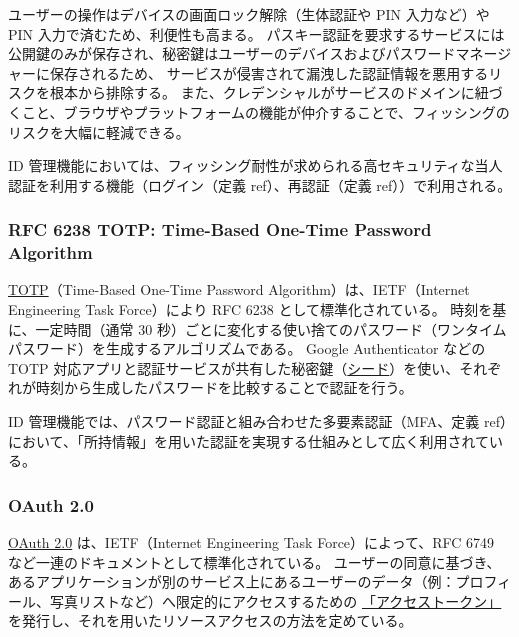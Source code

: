 \documentclass[uplatex]{jsarticle}
\def\ref#1{ref}%
\def\label#1{}%
\newcounter{thm}[section]
\begin{document}
ユーザーの操作はデバイスの画面ロック解除（生体認証や PIN 入力など）や PIN 入力で済むため、利便性も高まる。
パスキー認証を要求するサービスには公開鍵のみが保存され、秘密鍵はユーザーのデバイスおよびパスワードマネージャーに保存されるため、
サービスが侵害されて漏洩した認証情報を悪用するリスクを根本から排除する。
また、クレデンシャルがサービスのドメインに紐づくこと、ブラウザやプラットフォームの機能が仲介することで、フィッシングのリスクを大幅に軽減できる。

ID 管理機能においては、フィッシング耐性が求められる高セキュリティな当人認証を利用する機能（ログイン（定義 \ref{dfn:login}）、再認証（定義 \ref{dfn:reauthentication}））で利用される。

\subsubsection{RFC 6238 TOTP: Time-Based One-Time Password Algorithm}

\begin{dfn}\label{dfn:ch5-rfc6238}
\underline{TOTP}（Time-Based One-Time Password Algorithm）は、IETF（Internet Engineering Task Force）により RFC 6238 として標準化されている。
時刻を基に、一定時間（通常 30 秒）ごとに変化する使い捨てのパスワード（ワンタイムパスワード）を生成するアルゴリズムである。
Google Authenticator などの TOTP 対応アプリと認証サービスが共有した秘密鍵（\underline{シード}）を使い、それぞれが時刻から生成したパスワードを比較することで認証を行う。
\end{dfn}

ID 管理機能では、パスワード認証と組み合わせた多要素認証（MFA、定義 \ref{dfn:mfa}）において、「所持情報」を用いた認証を実現する仕組みとして広く利用されている。

\subsubsection{OAuth 2.0}

\begin{dfn}[OAuth 2.0]\label{dfn:ch5-oauth2}
\underline{OAuth 2.0} は、IETF（Internet Engineering Task Force）によって、RFC 6749 など一連のドキュメントとして標準化されている。
ユーザーの同意に基づき、あるアプリケーションが別のサービス上にあるユーザーのデータ（例：プロフィール、写真リストなど）へ限定的にアクセスするための
\underline{「アクセストークン」}を発行し、それを用いたリソースアクセスの方法を定めている。
\end{dfn}
\end{document}

